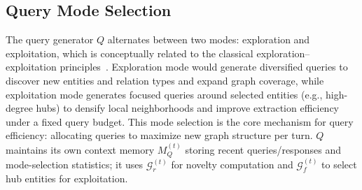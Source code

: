 




\subsection{Query Mode Selection}
\label{sec:query_mode}

The query generator $Q$ alternates between two modes: exploration and exploitation, which is conceptually related to the classical exploration–exploitation principles~\cite{auer2002finite,xiong2023iterative}. Exploration mode would generate diversified queries to discover new entities and relation types and expand graph coverage, while exploitation mode generates focused queries around selected entities (e.g., high-degree hubs) to densify local neighborhoods and improve extraction efficiency under a fixed query budget. This mode selection is the core mechanism for query efficiency: allocating queries to maximize new graph structure per turn.
$Q$ maintains its own context memory $M_Q^{(t)}$ storing recent queries/responses and mode-selection statistics; it uses $\mathcal{G}_r^{(t)}$ for novelty computation and $\mathcal{G}_f^{(t)}$ to select hub entities for exploitation. 


